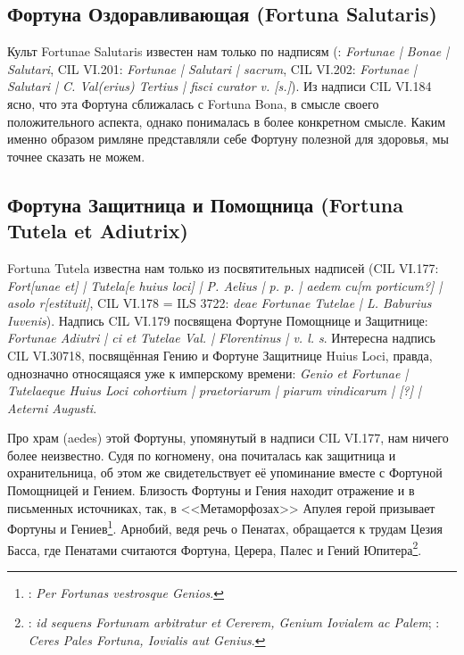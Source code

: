 \subsection{Фортуна Оздоравливающая (Fortuna Salutaris)}\label{FortunaSalutaris}

Культ Fortunae Salutaris известен нам только по надписям (: \textit{Fortunae | Bonae | Salutari}, CIL VI.201: \textit{Fortunae | Salutari | sacrum}, CIL VI.202: \textit{Fortunae | Salutari | C. Val(erius) Tertius | fisci curator v. [s.]}). Из надписи CIL VI.184 ясно, что эта Фортуна сближалась с Fortuna Bona, в смысле своего положительного аспекта, однако понималась в более конкретном смысле. Каким именно образом римляне представляли себе Фортуну полезной для здоровья, мы точнее сказать не можем.

\subsection{Фортуна Защитница и Помощница (Fortuna Tutela et Adiutrix)}\label{FortunaTutela}

Fortuna Tutela известна нам только из посвятительных надписей (CIL VI.177: \textit{Fort[unae et] | Tutela[e huius loci] | P. Aelius | p. p. | aedem cu[m porticum?] | asolo r[estituit]}, CIL VI.178 = ILS 3722: \textit{deae Fortunae Tutelae | L. Baburius Iuvenis}). Надпись CIL VI.179 посвящена Фортуне Помощнице и Защитнице: \textit{Fortunae Adiutri | ci et Tutelae Val. | Florentinus | v. l. s}. Интересна надпись CIL VI.30718, посвящённая Гению и Фортуне Защитнице Huius Loci, правда, однозначно относящаяся уже к имперскому времени: \textit{Genio et  Fortunae | Tutelaeque Huius Loci cohortium | praetoriarum | piarum vindicarum | [?] | Aeterni Augusti}. 

Про храм (aedes) этой Фортуны, упомянутый в надписи CIL VI.177, нам ничего более неизвестно. Судя по когномену, она почиталась как защитница и охранительница, об этом же свидетельствует её упоминание вместе с Фортуной Помощницей и Гением. Близость Фортуны и Гения находит отражение и в письменных источниках, так, в <<Метаморфозах>> Апулея герой призывает Фортуны и Гениев\footnote{: \textit{Per Fortunas vestrosque Genios}.}. Арнобий, ведя речь о Пенатах, обращается к трудам Цезия Басса, где Пенатами считаются Фортуна, Церера, Палес и Гений Юпитера\footnote{: \textit{id sequens Fortunam arbitratur et Cererem, Genium Iovialem ac Palem}; : \textit{Ceres Pales Fortuna, Iovialis aut Genius}.}.

